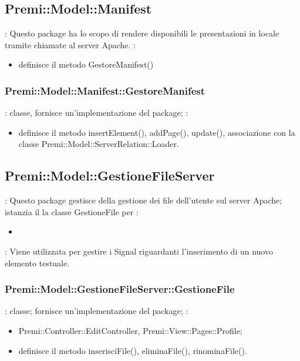 \subsection{Premi::Model::Manifest}{
   	\textbf{\tipo}: Questo package ha lo scopo di rendere disponibili le presentazioni in locale tramite chiamate al server Apache.
   	\textbf{\relaz}:
   	\begin{itemize}
   		\item definisce il metodo GestoreManifest()
   	\end{itemize}
}
	\subsubsection{Premi::Model::Manifest::GestoreManifest}{
		\textbf{\tipo}: classe, fornisce un'implementazione del package;
		\textbf{\relaz}:
		\begin{itemize}
			\item definisce il metodo insertElement(), addPage(), update(), associazione con la classe Premi::Model::ServerRelation::Loader.
		\end{itemize}
        }

\subsection{Premi::Model::GestioneFileServer} {
   	\textbf{\tipo}: Questo package gestisce della gestione dei file dell'utente sul server Apache; istanzia il la classe GestioneFile per 
   	\textbf{\relaz}:
   	\begin{itemize}
   		\item 
   	\end{itemize}
   	\textbf{\interfacce}: Viene utilizzata per gestire i Signal riguardanti l’inserimento di un nuovo elemento testuale.\\
	}
	\subsubsection{Premi::Model::GestioneFileServer::GestioneFile}{
		\textbf{\tipo}: classe; fornisce un'implementazione del package;
		\textbf{\relaz}:
		\begin{itemize}
			\item Premi::Controller::EditController, Premi::View::Pages::Profile;
			\item definisce il metodo inserisciFile(), eliminaFile(), rinominaFile().
		\end{itemize}
	}

	
